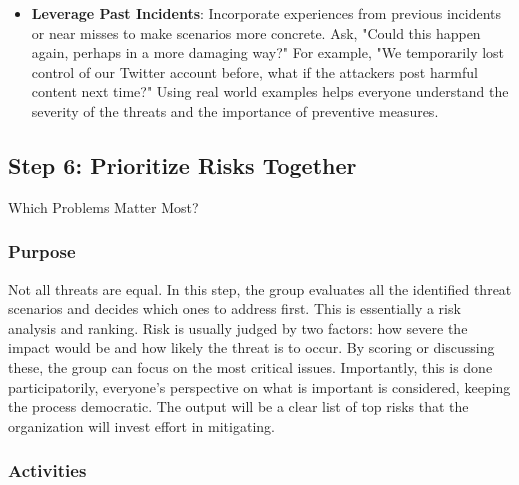 \begin{itemize}
    \item \textbf{Leverage Past Incidents}: Incorporate experiences from previous
    incidents or near misses to make scenarios more concrete. Ask, "Could this
    happen again, perhaps in a more damaging way?" For example, "We temporarily lost
    control of our Twitter account before, what if the attackers post harmful content
    next time?" Using real world examples helps everyone understand the severity of
    the threats and the importance of preventive measures.

\end{itemize}

\subsection{Step 6: Prioritize Risks Together}
\label{subsec:Step6}

Which Problems Matter Most?

\subsubsection{Purpose}

Not all threats are equal. In this step, the group evaluates all the
identified threat scenarios and decides which ones to address first. This is
essentially a risk analysis and ranking. Risk is usually judged by two factors:
how severe the impact would be and how likely the threat is to occur. By scoring
or discussing these, the group can focus on the most critical issues.
Importantly, this is done participatorily, everyone's perspective on what is
important is considered, keeping the process democratic. The output will be a
clear list of top risks that the organization will invest effort in mitigating.

\subsubsection{Activities}

